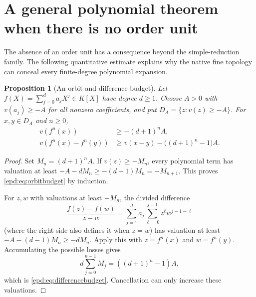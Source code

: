\documentclass[11pt,a4paper]{article}
\numberwithin{equation}{section}
\theoremstyle{plain}
\newtheorem{proposition}[proposition]{Proposition}
\theoremstyle{definition}
\theoremstyle{remark}
\begin{document}
\section{A general polynomial theorem when there is no order unit}
\label{epd:sec:general}
The absence of an order unit has a consequence beyond the
simple-reduction family. The following quantitative estimate explains
why the native fine topology can conceal every finite-degree
polynomial expansion.

\begin{proposition}[An orbit and difference budget]\label{epd:prop:budget}
Let $f(X)=\sum_{j=0}^d a_jX^j\in K[X]$ have degree $d\geq1$.
Choose $A>0$ with $v(a_j)\geq-A$ for all nonzero coefficients, and put
$D_A=\{z:v(z)\geq-A\}$. For $x,y\in D_A$ and $n\geq0$,
\begin{align}
 v(f^n(x))&\geq-(d+1)^n A,\label{epd:eq:orbitbudget}\\
 v(f^n(x)-f^n(y))&\geq v(x-y)-\bigl((d+1)^n-1\bigr)A.
 \label{epd:eq:differencebudget}
\end{align}
\end{proposition}
\begin{proof}
Set $M_n=(d+1)^nA$. If $v(z)\geq-M_n$, every polynomial term has
valuation at least $-A-dM_n\geq-(d+1)M_n=-M_{n+1}$. This proves
\eqref{epd:eq:orbitbudget} by induction.

For $z,w$ with valuations at least $-M_n$, the divided difference
\[
 \frac{f(z)-f(w)}{z-w}
 =\sum_{j=1}^d a_j\sum_{\ell=0}^{j-1}z^\ell w^{j-1-\ell}
\]
(where the right side also defines it when $z=w$) has valuation at
least $-A-(d-1)M_n\geq-dM_n$. Apply this with
$z=f^n(x)$ and $w=f^n(y)$. Accumulating the possible losses gives
\[
 d\sum_{j=0}^{n-1}M_j=((d+1)^n-1)A,
\]
which is \eqref{epd:eq:differencebudget}. Cancellation can only increase
these valuations.
\end{proof}
\end{document}

